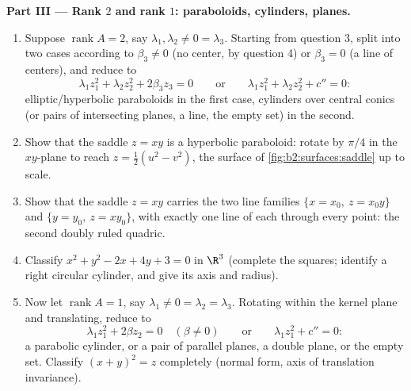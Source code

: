 \begin{problem}
\medskip
\noindent\textbf{Part III --- Rank $2$ and rank $1$:
paraboloids, cylinders, planes.}
\begin{enumerate}[resume]
  \item Suppose $\operatorname{rank}A = 2$, say $\lambda_1,
        \lambda_2 \neq 0 = \lambda_3$. Starting from question
        3, split into two cases according to $\beta_3 \neq 0$
        (no center, by question 4) or $\beta_3 = 0$ (a line
        of centers), and reduce to
        \[
        \lambda_1z_1^2 + \lambda_2z_2^2 + 2\beta_3z_3 = 0
        \qquad\text{or}\qquad
        \lambda_1z_1^2 + \lambda_2z_2^2 + c'' = 0 :
        \]
        elliptic/hyperbolic paraboloids in the first case,
        cylinders over central conics (or pairs of
        intersecting planes, a line, the empty set) in the
        second.
  \item Show that the saddle $z = xy$ is a hyperbolic
        paraboloid: rotate by $\pi/4$ in the $xy$-plane to
        reach $z = \tfrac12(u^2 - v^2)$, the surface of
        \cref{fig:b2:surfaces:saddle} up to scale.
  \item Show that the saddle $z = xy$ carries the two line
        families $\{x = x_0,\ z = x_0y\}$ and $\{y = y_0,\ z
        = xy_0\}$, with exactly one line of each through
        every point: the second doubly ruled quadric.
  \item Classify $x^2 + y^2 - 2x + 4y + 3 = 0$ in $\R^3$
        (complete the squares; identify a right circular
        cylinder, and give its axis and radius).
  \item Now let $\operatorname{rank}A = 1$, say $\lambda_1
        \neq 0 = \lambda_2 = \lambda_3$. Rotating within the
        kernel plane and translating, reduce to
        \[
        \lambda_1z_1^2 + 2\beta z_2 = 0 \quad (\beta \neq 0)
        \qquad\text{or}\qquad
        \lambda_1z_1^2 + c'' = 0 :
        \]
        a parabolic cylinder, or a pair of parallel planes, a
        double plane, or the empty set. Classify $(x + y)^2 =
        z$ completely (normal form, axis of translation
        invariance).
\end{enumerate}


\end{problem}
